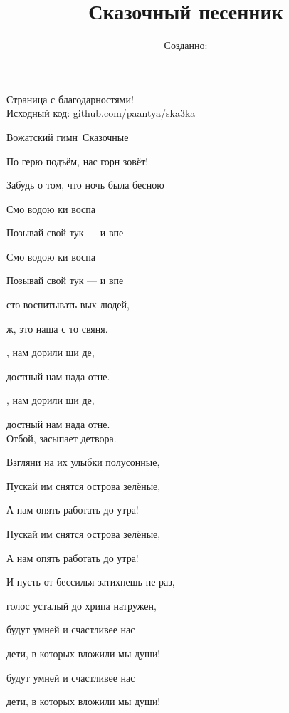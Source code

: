 \documentclass[11pt,a5paper]{book}
\title{ Сказочный песенник}
\author{}
\date{Созданно:  \RevDate}
\renewcommand{\tt}{\indent \indent}
\begin{document}
 

\mbox{}
\thispagestyle{empty}
\newpage
Страница с благодарностями!\\

Исходный код: github.com/paantya/ska3ka \\
\newpage
\begin{song}{Вожатский гимн}{}{~}{Сказочные}{}{}

По герю подъём, нас горн зовёт!\par
Забудь о том, что ночь была бесною\par
Смо водою ки воспа\par    
Позывай свой тук — и впе\par
Смо водою ки воспа\par    
Позывай свой тук — и впе\par

сто воспитывать вых людей,\par
{}  ж, это наша с то свяня.\par
{} , нам дорили ши де,\par
{} достный  нам нада отне.\par
{} , нам дорили ши де,\par
{} достный  нам нада отне.\\

Отбой, засыпает детвора.\par
Взгляни на их улыбки полусонные,\par
Пускай им снятся острова зелёные,\par
А нам опять работать до утра!\par
Пускай им снятся острова зелёные,\par
А нам опять работать до утра!\par

\tt И пусть от бессилья затихнешь не раз,\par
{} голос усталый до хрипа натружен,\par
{} будут умней и счастливее нас\par
{} дети, в которых вложили мы души!\par
{} будут умней и счастливее нас\par
{} дети, в которых вложили мы души!

\end{song}
\end{document}
